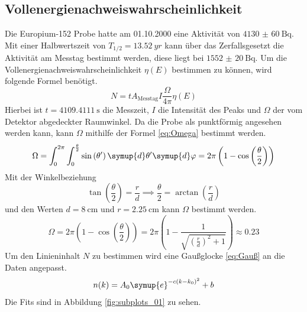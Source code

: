 \subsection{Vollenergienachweiswahrscheinlichkeit}
Die Europium-152 Probe hatte am 01.10.2000 eine Aktivität von $\SI{4130(60)}{\becquerel}$. Mit einer 
Halbwertszeit von $T_{1/2} = \SI{13.52}{yr}$ kann über das Zerfallsgesetzt die Aktivität 
am Messtag bestimmt werden, diese liegt bei $\SI{1552(20)}{\becquerel}$.
Um die Vollenergienachweiswahrscheinlichkeit $\eta(E)$ bestimmen zu können, wird folgende Formel benötigt.
\begin{equation}
  \label{eq:eta_N}
  N = tA_{\text{Messtag}}I\frac{\Omega}{4\pi}\eta(E)
\end{equation}
Hierbei ist $t=\SI{4109.4111}{\second}$ die Messzeit, $I$ die Intensität  des Peaks und $\Omega$ der vom Detektor abgedeckter
Raumwinkel.
Da die Probe als punktförmig angesehen werden kann, kann $\Omega$ mithilfe der Formel \eqref{eq:Omega} bestimmt werden.
\begin{equation}
  \label{eq:Omega}
  \Omega = \int_{0}^{2\pi}\int_{0}^{\frac{\theta}{2}} \sin\left(\theta'\right)\symup{d}\theta'\symup{d}\varphi = 
  2\pi \left(1-\cos\left(\frac{\theta}{2}\right)\right)
\end{equation}
Mit der Winkelbeziehung 
\begin{equation*}
  \tan\left(\frac{\theta}{2}\right) = \frac{r}{d} \implies \frac{\theta}{2} = \arctan\left(\frac{r}{d}\right)
\end{equation*}
und den Werten $d = \SI{8}{\centi\meter}$ und $r = \SI{2.25}{\centi\meter}$ kann $\Omega$ bestimmt werden.
\begin{equation*}
  \Omega = 2\pi \left(1-\cos\left(\frac{\theta}{2}\right)\right) = 2\pi\left(1- \frac{1}{\sqrt{\left(\frac{r}{d}\right)^2+1}}\right) \approx \num{0.23}
\end{equation*}
Um den Linieninhalt $N$ zu bestimmen wird eine Gaußglocke \eqref{eq:Gauß} an die Daten angepasst.
\begin{equation}
  \label{eq:Gauß}
  n(k)= A_0 \symup{e}^{-c(k-k_0)^2} + b
\end{equation}
Die Fits sind in Abbildung \ref{fig:subplots_01} zu sehen.
\FloatBarrier
